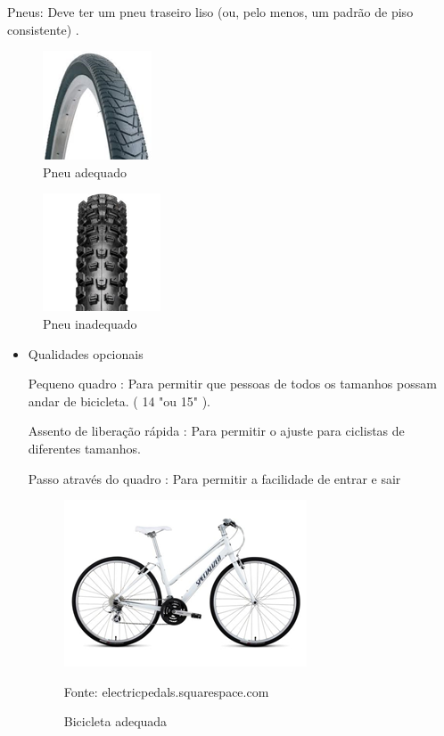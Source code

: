 \begin{itemize}
\begin{itemize}
	Pneus: Deve ter um pneu traseiro liso (ou, pelo menos, um padrão de piso consistente) . 
	
	\begin{figure}[H]
	 \centering
	\label{Pneu adequado}
	 \includegraphics[keepaspectratio=true,scale=0.8]{interacao/14.png}
	 \caption{Pneu adequado}
	\end{figure}
	
	\begin{figure}[H]
	 \centering
	\label{Pneu inadequado}
	 \includegraphics[keepaspectratio=true,scale=0.8]{interacao/15.png}
	 \caption{Pneu inadequado}
	\end{figure}
	
	\end{itemize}
	
	\begin{itemize}
	\item Qualidades opcionais
	
	Pequeno quadro : Para permitir que pessoas de todos os tamanhos possam andar de bicicleta. ( 14 "ou 15" ).

	Assento de liberação rápida : Para permitir o ajuste para ciclistas de diferentes tamanhos.
	
	Passo através do quadro : Para permitir a facilidade de entrar e sair 
	
	\begin{figure}[H]
	 \centering
	\label{Bicicleta adequada}
	 \includegraphics[keepaspectratio=true,scale=0.8]{interacao/16.png}
	 \caption{Bicicleta adequada}
	 \small{Fonte: electricpedals.squarespace.com}
	\end{figure}
		
	\end{itemize}
\end{itemize}

